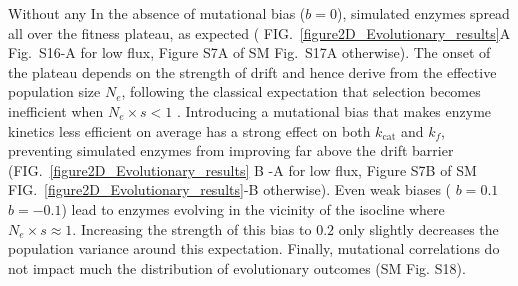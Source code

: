\documentclass[11pt,onecolumn]{article}
\providecommand{\DIFadd}[1]{{\protect\color{blue} \sf #1}} %
\providecommand{\DIFdel}[1]{{\protect\color{red} \scriptsize #1}} %
\providecommand{\DIFaddbegin}{} %
\providecommand{\DIFaddend}{} %
\providecommand{\DIFdelbegin}{} %
\providecommand{\DIFdelend}{} %
\begin{document}
\DIFdel{Without any }\DIFdelend \DIFaddbegin \DIFadd{In the absence of }\DIFaddend mutational bias ($b=0$), simulated enzymes spread \DIFdelbegin \DIFdel{all }\DIFdelend over the fitness plateau, as expected (\DIFdelbegin \DIFdel{FIG.~\ref{figure2D_Evolutionary_results}A }\DIFdelend \DIFaddbegin \DIFadd{Fig.~S16-A }\DIFaddend for low flux, \DIFdelbegin \DIFdel{Figure S7A of SM }\DIFdelend \DIFaddbegin \DIFadd{Fig.~S17A }\DIFaddend otherwise). The onset of the plateau depends on the strength of drift and hence derive from the effective population size $N_e$, following the classical expectation that selection becomes inefficient when $N_e \times s < 1$ \DIFdelbegin \DIFdel{\citep{Kimura68}}\DIFdelend \DIFaddbegin \DIFadd{\citep{Wright31,Kimura68}}\DIFaddend . Introducing a mutational bias that makes enzyme kinetics less efficient on average has a strong effect on both $k_\text{cat}$ and $k_f$, preventing simulated enzymes from improving far above the drift barrier (FIG.~\ref{figure2D_Evolutionary_results}\DIFdelbegin \DIFdel{B }\DIFdelend \DIFaddbegin \DIFadd{-A }\DIFaddend for low flux, \DIFdelbegin \DIFdel{Figure S7B of SM }\DIFdelend \DIFaddbegin \DIFadd{FIG.~\ref{figure2D_Evolutionary_results}-B }\DIFaddend otherwise). 
Even weak biases (\DIFdelbegin \DIFdel{$b=0.1$}\DIFdelend \DIFaddbegin \DIFadd{$b=-0.1$}\DIFaddend ) lead to enzymes evolving in the vicinity of the isocline where $N_e \times s \approx 1$. Increasing the strength of this bias to $0.2$ only slightly decreases the population variance around this expectation. \DIFaddbegin \DIFadd{Finally, mutational correlations do not impact much the distribution of evolutionary outcomes (SM Fig. S18).
}\DIFaddend 
\end{document}

